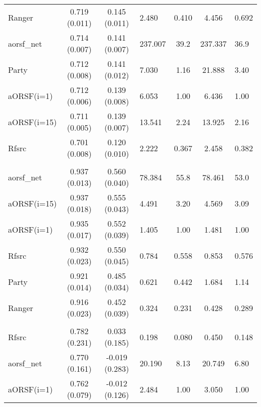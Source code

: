 \documentclass[twoside,11pt]{article}\usepackage[]{graphicx}\usepackage[]{color}
\newenvironment{knitrout}{}{} %
\begin{document}
\begin{knitrout}
\begin{longtable}{lcclccl}
\hspace{1em}Ranger & 0.719 (0.011) & 0.145 (0.011) & 2.480 & 0.410 & 4.456 & 0.692\\
\hspace{1em}aorsf\_net & 0.714 (0.007) & 0.141 (0.007) & 237.007 & 39.2 & 237.337 & 36.9\\
\hspace{1em}Party & 0.712 (0.008) & 0.141 (0.012) & 7.030 & 1.16 & 21.888 & 3.40\\
\hspace{1em}aORSF(i=1) & 0.712 (0.006) & 0.139 (0.008) & 6.053 & 1.00 & 6.436 & 1.00\\
\hspace{1em}aORSF(i=15) & 0.711 (0.005) & 0.139 (0.007) & 13.541 & 2.24 & 13.925 & 2.16\\
\hspace{1em}Rfsrc & 0.701 (0.008) & 0.120 (0.010) & 2.222 & 0.367 & 2.458 & 0.382\\
\addlinespace[0.3em]
\hline
\multicolumn{7}{l}{\textit{\textbf{time\_to\_million}}}\\
\hline
\hspace{1em}aorsf\_net & 0.937 (0.013) & 0.560 (0.040) & 78.384 & 55.8 & 78.461 & 53.0\\
\hspace{1em}aORSF(i=15) & 0.937 (0.018) & 0.555 (0.043) & 4.491 & 3.20 & 4.569 & 3.09\\
\hspace{1em}aORSF(i=1) & 0.935 (0.017) & 0.552 (0.039) & 1.405 & 1.00 & 1.481 & 1.00\\
\hspace{1em}Rfsrc & 0.932 (0.023) & 0.550 (0.045) & 0.784 & 0.558 & 0.853 & 0.576\\
\hspace{1em}Party & 0.921 (0.014) & 0.485 (0.034) & 0.621 & 0.442 & 1.684 & 1.14\\
\hspace{1em}Ranger & 0.916 (0.023) & 0.452 (0.039) & 0.324 & 0.231 & 0.428 & 0.289\\
\addlinespace[0.3em]
\hline
\multicolumn{7}{l}{\textit{\textbf{vdv}}}\\
\hline
\hspace{1em}Rfsrc & 0.782 (0.231) & 0.033 (0.185) & 0.198 & 0.080 & 0.450 & 0.148\\
\hspace{1em}aorsf\_net & 0.770 (0.161) & -0.019 (0.283) & 20.190 & 8.13 & 20.749 & 6.80\\
\hspace{1em}aORSF(i=1) & 0.762 (0.079) & -0.012 (0.126) & 2.484 & 1.00 & 3.050 & 1.00\\

\end{longtable}
\end{knitrout}
\end{document}
